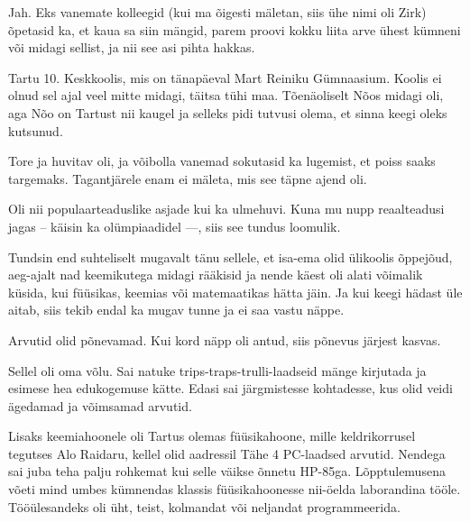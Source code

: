 
Jah. Eks vanemate kolleegid (kui ma õigesti mäletan, siis ühe
nimi oli Zirk) õpetasid ka, et kaua sa siin mängid, parem proovi kokku liita arve 
ühest kümneni või midagi sellist, ja nii see asi pihta hakkas.


Tartu 10. Keskkoolis, mis on tänapäeval Mart 
Reiniku Gümnaasium. Koolis ei olnud sel ajal veel mitte midagi, täitsa tühi maa. 
Tõenäoliselt Nõos midagi oli, aga Nõo on Tartust nii kaugel ja 
selleks pidi tutvusi olema, et sinna keegi oleks kutsunud.


Tore ja huvitav oli, ja võibolla vanemad sokutasid ka lugemist, et 
poiss saaks targemaks. Tagantjärele enam ei mäleta, mis see täpne ajend oli.


Oli nii populaarteaduslike asjade kui ka ulmehuvi. Kuna mu nupp 
reaalteadusi jagas -- käisin ka olümpiaadidel ---, siis see 
tundus loomulik. 


Tundsin end suhteliselt mugavalt tänu sellele, et isa-ema olid ülikoolis õppejõud, 
aeg-ajalt nad keemikutega midagi rääkisid ja nende käest oli alati 
võimalik küsida, kui füüsikas, keemias või matemaatikas hätta jäin. 
Ja kui keegi hädast üle aitab, siis tekib endal ka mugav 
tunne ja ei saa vastu näppe.


Arvutid olid põnevamad. Kui kord näpp oli antud, siis põnevus järjest kasvas.


Sellel oli oma võlu. Sai natuke trips-traps-trulli-laadseid 
mänge kirjutada ja esimese hea edukogemuse kätte. Edasi sai 
järgmistesse kohtadesse, kus olid veidi ägedamad ja võimsamad arvutid.

Lisaks keemiahoonele oli Tartus olemas 
füüsikahoone, mille keldrikorrusel tegutses 
Alo Raidaru, kellel olid aadressil Tähe 4 PC-laadsed arvutid. Nendega sai juba teha palju rohkemat kui selle väikse 
õnnetu HP-85ga. Lõpptulemusena võeti mind umbes 
kümnendas klassis füüsikahoonesse nii-öelda laborandina tööle. 
Tööülesandeks oli üht, teist, kolmandat või neljandat programmeerida. 

